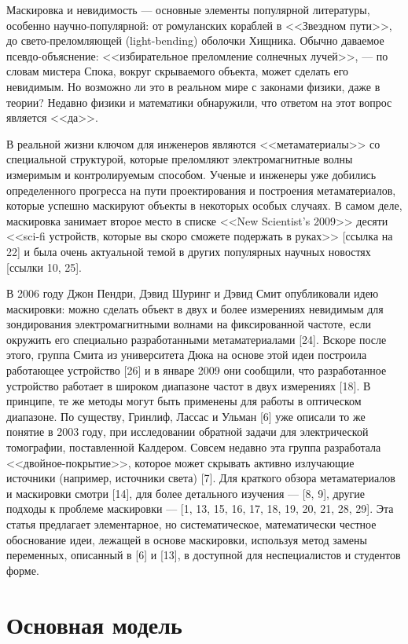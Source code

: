 \documentclass[a4paper, 12pt]{article}
\begin{document}
Маскировка и невидимость --- основные элементы популярной литературы, особенно научно-популярной: от ромуланских кораблей в <<Звездном пути>>, до свето-преломляющей (light-bending) оболочки Хищника. Обычно даваемое псевдо-объяснение: <<избирательное преломление солнечных лучей>>, --- по словам мистера Спока, вокруг скрываемого объекта, может сделать его невидимым. Но возможно ли это в реальном мире с законами физики, даже в теории? Недавно физики и математики обнаружили, что ответом на этот вопрос является <<да>>.


В реальной жизни ключом для инженеров являются <<метаматериалы>> со специальной структурой, которые преломляют электромагнитные волны измеримым и контролируемым способом. Ученые и инженеры уже добились определенного прогресса на пути проектирования и построения метаматериалов, которые успешно маскируют объекты в некоторых особых случаях. В самом деле, маскировка занимает второе место в списке <<New Scientist's 2009>> десяти <<sci-fi устройств, которые вы скоро сможете подержать в руках>> [ссылка на 22] и была очень актуальной темой в других популярных научных новостях [ссылки 10, 25].


В 2006 году Джон Пендри, Дэвид Шуринг и Дэвид Смит опубликовали идею маскировки: можно сделать объект в двух и более измерениях невидимым для зондирования электромагнитными волнами на фиксированной частоте, если окружить его специально разработанными метаматериалами [24]. Вскоре после этого, группа Смита из университета Дюка на основе этой идеи построила работающее устройство [26] и в январе 2009 они сообщили, что разработанное устройство работает в широком диапазоне частот в двух измерениях [18]. В принципе, те же методы могут быть применены для работы в оптическом диапазоне. По существу, Гринлиф, Лассас и Ульман [6] уже описали то же понятие в 2003 году, при исследовании обратной задачи для электрической томографии, поставленной Калдером. Совсем недавно эта группа разработала <<двойное-покрытие>>, которое может скрывать активно излучающие источники (например, источники света) [7]. Для краткого обзора метаматериалов и маскировки смотри [14], для более детального изучения --- [8, 9], другие подходы к проблеме маскировки --- [1, 13, 15, 16, 17, 18, 19, 20, 21, 28, 29]. Эта статья предлагает элементарное, но систематическое, математически честное обоснование идеи, лежащей в основе маскировки, используя метод замены переменных, описанный в [6] и [13], в доступной для неспециалистов и студентов форме.

\section{Основная модель}
\end{document}
